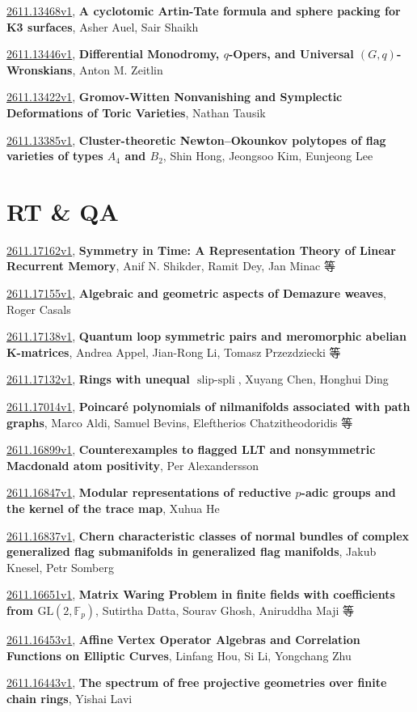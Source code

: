 \documentclass[9pt, a4paper]{article}
\theoremstyle{plain}
\theoremstyle{definition}
\theoremstyle{remark}
\newcommand{\arxiv}[3]{\href{https://arxiv.org/abs/#1}{#1}, \textbf{\textcolor{arxivblue}{#2}}, #3}
\begin{document}
\arxiv{2611.13468v1}{A cyclotomic Artin-Tate formula and sphere packing for K3 surfaces}{Asher Auel, Sair Shaikh}

\arxiv{2611.13446v1}{Differential Monodromy, $q$-Opers, and Universal $(G,q)$-Wronskians}{Anton M. Zeitlin}

\arxiv{2611.13422v1}{Gromov-Witten Nonvanishing and Symplectic Deformations of Toric Varieties}{Nathan Tausik}

\arxiv{2611.13385v1}{Cluster-theoretic Newton--Okounkov polytopes of flag varieties of types $A_4$ and $B_2$}{Shin Hong, Jeongsoo Kim, Eunjeong Lee}


\section{RT \& QA}
\arxiv{2611.17162v1}{Symmetry in Time: A Representation Theory of Linear Recurrent Memory}{Anif N. Shikder, Ramit Dey, Jan Minac 等}

\arxiv{2611.17155v1}{Algebraic and geometric aspects of Demazure weaves}{Roger Casals}

\arxiv{2611.17138v1}{Quantum loop symmetric pairs and meromorphic abelian K-matrices}{Andrea Appel, Jian-Rong Li, Tomasz Przezdziecki 等}

\arxiv{2611.17132v1}{Rings with unequal $\operatorname{slip-spli}$}{Xuyang Chen, Honghui Ding}

\arxiv{2611.17014v1}{Poincaré polynomials of nilmanifolds associated with path graphs}{Marco Aldi, Samuel Bevins, Eleftherios Chatzitheodoridis 等}

\arxiv{2611.16899v1}{Counterexamples to flagged LLT and nonsymmetric Macdonald atom positivity}{Per Alexandersson}

\arxiv{2611.16847v1}{Modular representations of reductive $p$-adic groups and the kernel of the trace map}{Xuhua He}

\arxiv{2611.16837v1}{Chern characteristic classes of normal bundles of complex generalized flag submanifolds in generalized flag manifolds}{Jakub Knesel, Petr Somberg}

\arxiv{2611.16651v1}{Matrix Waring Problem in finite fields with coefficients from $\mathrm{GL}(2, \mathbb{F}_p)$}{Sutirtha Datta, Sourav Ghosh, Aniruddha Maji 等}

\arxiv{2611.16453v1}{Affine Vertex Operator Algebras and Correlation Functions on Elliptic Curves}{Linfang Hou, Si Li, Yongchang Zhu}

\arxiv{2611.16443v1}{The spectrum of free projective geometries over finite chain rings}{Yishai Lavi}
\end{document}
